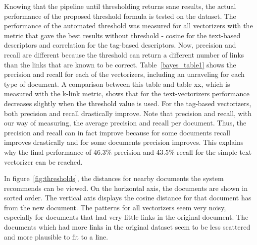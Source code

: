 Knowing that the pipeline until thresholding returns sane results, the actual performance
of the proposed threshold formula is tested on the dataset. The performance of the automated threshold was measured for all vectorizers
with the metric that gave the best results without threshold - cosine for the
text-based descriptors and correlation for the tag-based descriptors. Now,
precision and recall are different because the threshold can return a different
number of links than the links that are known to be correct. Table~\ref{bayes_table1} shows the
precision and recall for each of the vectorizers, including an unraveling for
each type of document. A comparison between this table and table xx, which is
measured with the k-link metric, shows that for the text-vectorizers
performance decreases slightly when the threshold value is used. 
For the tag-based vectorizers, both precision and recall drastically
improve. Note that precision and recall, with our way of measuring, the average
precision and recall per document. Thus, the precision and recall can in fact
improve because for some documents recall improves drastically and for some
documents precision improves. This explains why the final performance of 46.3\%
precision and 43.5\% recall for the simple text vectorizer can be reached. 

In figure~\ref{fig:thresholds}, the distances for nearby documents the system
recommends can be viewed. On the horizontal axis, the documents are shown in
sorted order. The vertical axis displays the cosine distance for that document
has from the new document. The patterns for all vectorizers seem very noisy,
especially for documents that had very little links in the original document.
The documents which had more links in the original dataset seem to be less
scattered and more plausible to fit to a line.
